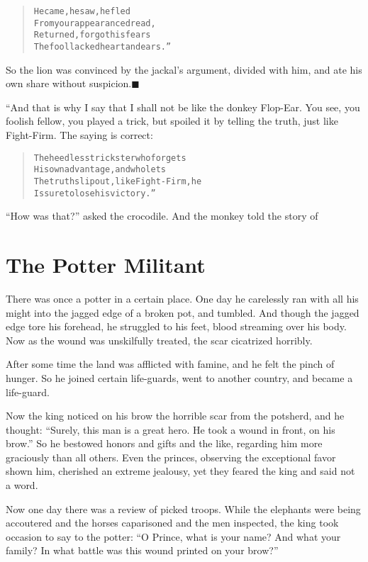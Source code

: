 \documentclass[article, twoside, 14pt]{memoir}
\newcommand{\qed}{\hfill \ensuremath{\blacksquare}}
\renewenvironment{verbatim}{%
\begin{quote}%
\vskip -10pt%
\begin{alltt}\normalfont\large}{\end{alltt}%
\end{quote}%
\vskip -10pt
} %
\begin{document}
\begin{verbatim}
He came, he saw, he fled
From your appearance dread,
Returned, forgot his fears{\textemdash}
The fool lacked heart and ears.”
\end{verbatim}
So the lion was convinced by the jackal's argument, divided
with him, and ate his own share without
suspicion.\hyperref[s68]{\qed}

“And that is why I say that I shall not be like the donkey
Flop-Ear. You see, you foolish fellow, you played a trick, but
spoiled it by telling the truth, just like Fight-Firm. The saying
is correct:

\begin{verbatim}
The heedless trickster who forgets
His own advantage, and who lets
The truth slip out, like Fight-Firm, he
Is sure to lose his victory.”
\end{verbatim}
``How was that?'' asked the crocodile. And the monkey told the
story of

\chapter{The Potter Militant}

\label{s69}

There was once a potter in a certain place. One day he carelessly
ran with all his might into the jagged edge of a broken pot, and
tumbled. And though the jagged edge tore his forehead, he struggled
to his feet, blood streaming over his body. Now as the wound was
unskilfully treated, the scar cicatrized horribly.

After some time the land was afflicted with famine, and he felt the
pinch of hunger. So he joined certain life-guards, went to another
country, and became a life-guard.

Now the king noticed on his brow the horrible scar from the
potsherd, and he thought:
``Surely, this man is a great hero. He took a wound in front, on his brow.''
So he bestowed honors and gifts and the like, regarding him more
graciously than all others. Even the princes, observing the
exceptional favor shown him, cherished an extreme jealousy, yet
they feared the king and said not a word.

Now one day there was a review of picked troops. While the
elephants were being accoutered and the horses caparisoned and the
men inspected, the king took occasion to say to the potter:
``O Prince, what is your name? And what your family? In what battle was this wound printed on your brow?''
\end{document}

